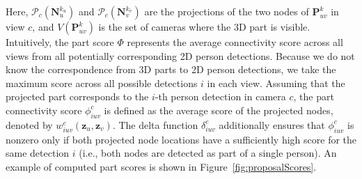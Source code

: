 Here, $\mathcal{P}_c(\mathbf{N}^{k_u}_{u})$ and $\mathcal{P}_c(\mathbf{N}^{k_v}_{v})$ are the projections of the two nodes of $\mathbf{P}_{uv}^k$ in view $c$, and $ V( \mathbf{P}_{uv}^k )$ is the set of cameras where the 3D part is visible. Intuitively, the part score ${\Phi}$ represents the average connectivity score across all views from all potentially corresponding 2D person detections. Because we do not know the correspondence from 3D parts to 2D person detections, we take the maximum score across all possible detections $i$ in each view. Assuming that the projected part corresponds to the $i$-th person detection in camera $c$, the part connectivity score %
$\phi_{iuv}^c$ is defined as the average score of the projected nodes, denoted by $w_{iuv}^c(\mathbf{z}_u,\mathbf{z}_v)$. The delta function $\delta^c_{iuv}$ additionally ensures that $\phi_{iuv}^c$ is nonzero only if both projected node locations have a sufficiently high score for the same detection $i$ (i.e., both nodes are detected as part of a single person). An example of computed part scores is shown in Figure~\ref{fig:proposalScores}.


